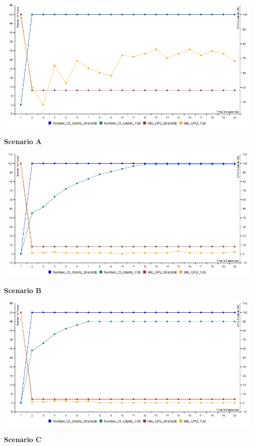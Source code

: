\documentclass[12pt]{article}
\begin{document}
  \begin{center}
    \includegraphics[scale=0.48]{scenario_a/users.png}

    \textbf{Scenario A}
    
    \includegraphics[scale=0.48]{scenario_b/users.png}
    
    \textbf{Scenario B}
    
    \includegraphics[scale=0.48]{scenario_c/users.png}
    
    \textbf{Scenario C}

  \end{center}
\end{document}
